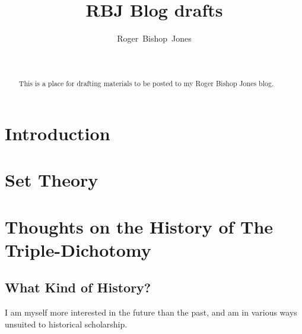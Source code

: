 \documentclass[10pt,titlepage]{article}
\title{RBJ Blog drafts}
\author{Roger~Bishop~Jones}
\date{\ }
\begin{document}
                               
\begin{titlepage}
\maketitle

\begin{abstract}
This is a place for drafting materials to be posted to my Roger Bishop Jones blog.
\end{abstract}





\end{titlepage}

\setcounter{tocdepth}{2}
{\parskip-0pt\tableofcontents}



\section{Introduction}



\section{Set Theory}

\subsection{}

\section{Thoughts on the History of The Triple-Dichotomy}

\subsection{What Kind of History?}

I am myself more interested in the future than the past, and am in various ways unsuited to historical scholarship.
\end{document}
